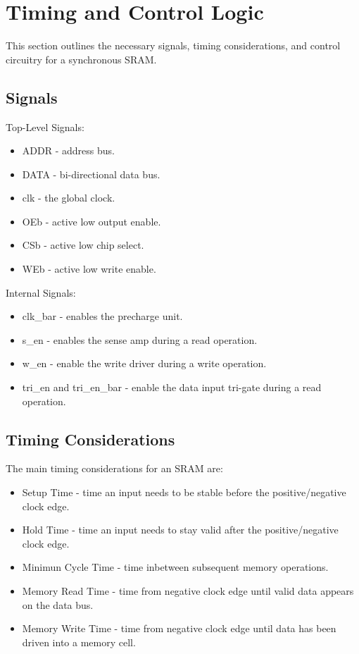 \section{Timing and Control Logic}
\label{timing}

This section outlines the necessary signals, timing considerations, and control circuitry for a synchronous SRAM.

\subsection{Signals}
\label{signals}
Top-Level Signals:
\begin{itemize}
\setlength{\itemsep}{0pt}
\item ADDR - address bus.
\item DATA - bi-directional data bus.
\item clk - the global clock.
\item OEb - active low output enable.
\item CSb - active low chip select.
\item WEb - active low write enable.
\end{itemize}

Internal Signals:
\begin{itemize}
\setlength{\itemsep}{0pt}
\item clk\_bar - enables the precharge unit.
\item s\_en - enables the sense amp during a read operation.
\item w\_en - enable the write driver during a write operation.
\item tri\_en and tri\_en\_bar - enable the data input tri-gate during a read operation.
\end{itemize}

\subsection{Timing Considerations}
\label{timing_params}

The main timing considerations for an SRAM are:
\begin{itemize}
\setlength{\itemsep}{0pt}
\item Setup Time - time an input needs to be stable before the positive/negative clock edge.
\item Hold Time - time an input needs to stay valid after the positive/negative clock edge.  
\item Minimun Cycle Time - time inbetween subsequent memory operations.
\item Memory Read Time - time from negative clock edge until valid data appears on the data bus.
\item Memory Write Time - time from negative clock edge until data has been driven into a memory cell.
\end{itemize}

